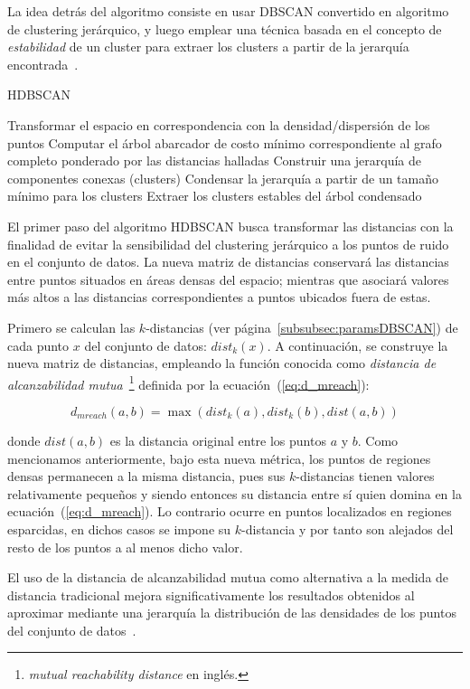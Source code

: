 La idea detrás del algoritmo consiste en usar DBSCAN convertido en algoritmo de clustering jerárquico, y luego emplear una técnica basada en el concepto de \textit{estabilidad} de un cluster para extraer los clusters a partir de la jerarquía encontrada~\cite{McInnes17}.

\begin{algorithm}
    \caption{HDBSCAN}
    \label{algorithm:HDBSCAN}
    Transformar el espacio en correspondencia con la densidad/dispersión de los puntos\;
    Computar el árbol abarcador de costo mínimo correspondiente al grafo completo ponderado por las distancias halladas\;
    Construir una jerarquía de componentes conexas (clusters)\;
    Condensar la jerarquía a partir de un tamaño mínimo para los clusters\;
    Extraer los clusters estables del árbol condensado\;
\end{algorithm}

El primer paso del algoritmo HDBSCAN busca transformar las distancias con la finalidad de evitar la sensibilidad del clustering jerárquico a los puntos de ruido en el conjunto de datos.
La nueva matriz de distancias conservará las distancias entre puntos situados en áreas densas del espacio;
mientras que asociará valores más altos a las distancias correspondientes a puntos ubicados fuera de estas.

Primero se calculan las $k$-distancias (ver página~\ref{subsubsec:paramsDBSCAN}) de cada punto $x$ del conjunto de datos: $dist_k(x)$.
A continuación, se construye la nueva matriz de distancias, empleando la función conocida como \textit{distancia de alcanzabilidad mutua}~\footnote{\textit{mutual reachability distance} en inglés.} definida por la ecuación~(\ref{eq:d_mreach}):

\begin{equation}
    \label{eq:d_mreach}
    d_{mreach}(a,b)=\max(dist_k(a), dist_k(b), dist(a,b))
\end{equation}

\noindent
donde $dist(a,b)$ es la distancia original entre los puntos $a$ y $b$.
Como mencionamos anteriormente, bajo esta nueva métrica, los puntos de regiones densas permanecen a la misma distancia, pues sus $k$-distancias tienen valores relativamente pequeños y siendo entonces su distancia entre sí quien domina en la ecuación~(\ref{eq:d_mreach}).
Lo contrario ocurre en puntos localizados en regiones esparcidas, en dichos casos se impone su $k$-distancia y por tanto son alejados del resto de los puntos a al menos dicho valor.

El uso de la distancia de alcanzabilidad mutua como alternativa a la medida de distancia tradicional mejora significativamente los resultados obtenidos al aproximar mediante una jerarquía la distribución de las densidades de los puntos del conjunto de datos~\cite{Eldridge15}.

